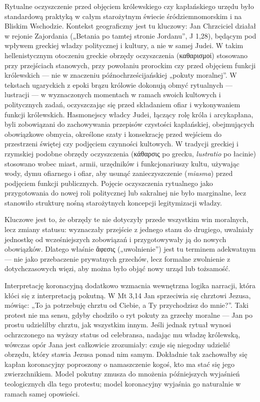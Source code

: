 Rytualne oczyszczenie przed objęciem królewskiego czy kapłańskiego urzędu było standardową praktyką w całym starożytnym świecie śródziemnomorskim i na Bliskim Wschodzie.
Kontekst geograficzny jest tu kluczowy: Jan Chrzciciel działał w rejonie Zajordania („Betania po tamtej stronie Jordanu”, J 1,28), będącym pod wpływem greckiej władzy politycznej i kultury, a nie w samej Judei.
W takim hellenistycznym otoczeniu greckie obrzędy oczyszczenia (καθαρισμοί) stosowano przy przejściach stanowych, przy powołaniu prorockim czy przed objęciem funkcji królewskich — nie w znaczeniu późnochrześcijańskiej „pokuty moralnej”.
W tekstach ugaryckich z epoki brązu królowie dokonują obmyć rytualnych — lustracji — w wyznaczonych momentach w ramach swoich kultowych i politycznych zadań, oczyszczając się przed składaniem ofiar i wykonywaniem funkcji królewskich.
Hasmonejscy władcy Judei, łączący rolę króla i arcykapłana, byli zobowiązani do zachowywania przepisów czystości kapłańskiej, obejmujących obowiązkowe obmycia, określone szaty i konsekrację przed wejściem do przestrzeni świętej czy podjęciem czynności kultowych.
W tradycji greckiej i rzymskiej podobne obrzędy oczyszczenia (κάθαρσις po grecku, \textit{lustratio} po łacinie) stosowano wobec miast, armii, urzędników i funkcjonariuszy kultu, używając wody, dymu ofiarnego i ofiar, aby usunąć zanieczyszczenie (\textit{miasma}) przed podjęciem funkcji publicznych.
Pojęcie oczyszczenia rytualnego jako przygotowania do nowej roli politycznej lub sakralnej nie było marginalne, lecz stanowiło strukturę nośną starożytnych koncepcji legitymizacji władzy.

Kluczowe jest to, że obrzędy te nie dotyczyły przede wszystkim win moralnych, lecz zmiany statusu: wyznaczały przejście z jednego stanu do drugiego, uwalniały jednostkę od wcześniejszych zobowiązań i przygotowywały ją do nowych obowiązków.
Dlatego właśnie ἄφεσις („uwolnienie”) jest tu terminem adekwatnym — nie jako przebaczenie prywatnych grzechów, lecz formalne zwolnienie z dotychczasowych więzi, aby można było objąć nowy urząd lub tożsamość.

Interpretację koronacyjną dodatkowo wzmacnia wewnętrzna logika narracji, która kłóci się z interpretacją pokutną.
W Mt 3,14 Jan sprzeciwia się chrztowi Jezusa, mówiąc: „To ja potrzebuję chrztu od Ciebie, a Ty przychodzisz do mnie?”.
Taki protest nie ma sensu, gdyby chodziło o ryt pokuty za grzechy moralne — Jan po prostu udzieliłby chrztu, jak wszystkim innym.
Jeśli jednak rytuał wynosi ochrzczonego na wyższy status od celebransa, nadając mu władzę królewską, wówczas opór Jana jest całkowicie zrozumiały: czuje się niegodny udzielić obrzędu, który stawia Jezusa ponad nim samym.
Dokładnie tak zachowałby się kapłan koronacyjny poproszony o namaszczenie kogoś, kto ma stać się jego zwierzchnikiem.
Model pokutny zmusza do mnożenia późniejszych wyjaśnień teologicznych dla tego protestu; model koronacyjny wyjaśnia go naturalnie w ramach samej opowieści.

